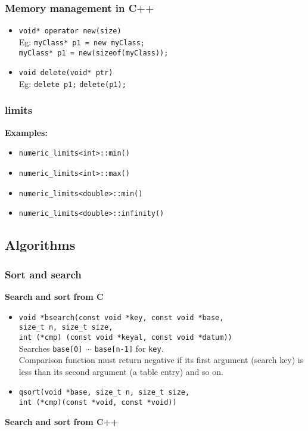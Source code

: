 \subsubsection{Memory management in C++}
\begin{itemize}
\item \texttt{void* operator new(size)}	\\
Eg: \texttt{myClass* p1 = new myClass;} \\
\texttt{myClass* p1 = new(sizeof(myClass));}\\
\item \texttt{void delete(void* ptr)}\\
Eg: \texttt{delete p1;} 
\texttt{delete(p1);} 
\end{itemize}

\subsubsection{limits}
\textbf{Examples:}
\begin{itemize}
\item \texttt{numeric\_limits<int>::min()}
\item \texttt{numeric\_limits<int>::max()}
\item \texttt{numeric\_limits<double>::min()}
\item \texttt{numeric\_limits<double>::infinity()}
\end{itemize}

\subsection{Algorithms}

\subsubsection{Sort and search}
\textbf{Search and sort from C}
\begin{itemize}
	\item \texttt{void *bsearch(const void *key, const void *base, \\
	size\_t n, size\_t size, \\
	int (*cmp) (const void *keyal, const void *datum))}\\
	Searches \texttt{base[0]} $\cdots$ \texttt{base[n-1]} for \texttt{key}.\\
	Comparison function must return negative if its first argument (search key) is less than its second argument (a table entry) and so on. 

	\item \texttt{qsort(void *base, size\_t n, size\_t size, \\
	int (*cmp)(const *void, const *void))}
\end{itemize}
\textbf{Search and sort from C++}\\

